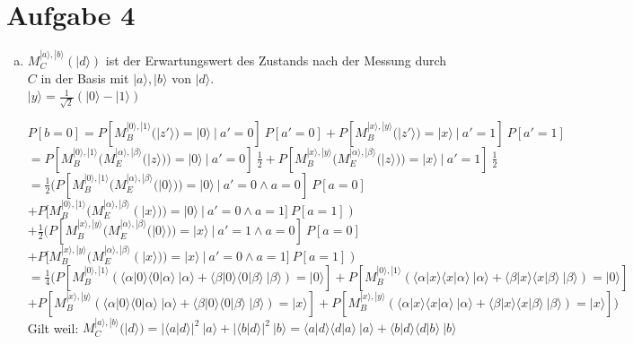 \documentclass[a4paper]{scrartcl}
\begin{document}
\newpage
\section*{Aufgabe 4}
\begin{enumerate}[a)]

\item $M_C^{|a\rangle,|b\rangle}(|d\rangle)$ ist der Erwartungswert des Zustands nach der Messung durch $C$ in der Basis mit $|a\rangle,|b\rangle$ von $|d\rangle$.\\
$|y\rangle = \frac{1}{\sqrt{2}} (|0\rangle -|1\rangle)$

$P[b=0] = P[M_B^{|0\rangle,|1\rangle}(|z'\rangle)=|0\rangle~|~a'=0]~P[a'=0] + P[M_B^{|x\rangle,|y\rangle}(|z'\rangle)=|x\rangle~|~a'=1]~P[a'=1]$\\
$=P[M_B^{|0\rangle,|1\rangle}(M_E^{|\alpha\rangle,|\beta\rangle}(|z\rangle))=|0\rangle~|~a'=0]~\frac{1}{2} + P[M_B^{|x\rangle,|y\rangle}(M_E^{|\alpha\rangle,|\beta\rangle}(|z\rangle))=|x\rangle~|~a'=1]~\frac{1}{2}$\\
$=\frac{1}{2} (P[M_B^{|0\rangle,|1\rangle}(M_E^{|\alpha\rangle,|\beta\rangle}(|0\rangle))=|0\rangle~|~a'=0 \wedge a=0]~P[a=0]$\\
$+ P[M_B^{|0\rangle,|1\rangle}(M_E^{|\alpha\rangle,|\beta\rangle}(|x\rangle))=|0\rangle~|~a'=0 \wedge a=1]~P[a=1])$\\
$+\frac{1}{2} (P[M_B^{|x\rangle,|y\rangle}(M_E^{|\alpha\rangle,|\beta\rangle}(|0\rangle))=|x\rangle~|~a'=1 \wedge a=0]~P[a=0]$\\
$+ P[M_B^{|x\rangle,|y\rangle}(M_E^{|\alpha\rangle,|\beta\rangle}(|x\rangle))=|x\rangle~|~a'=0 \wedge a=1]~P[a=1])$\\
$=\frac{1}{4} (P[M_B^{|0\rangle,|1\rangle}(\langle \alpha|0\rangle \langle 0|\alpha\rangle~|\alpha\rangle + \langle \beta|0\rangle \langle 0|\beta\rangle~|\beta\rangle)=|0\rangle] + P[M_B^{|0\rangle,|1\rangle}(\langle \alpha|x\rangle \langle x|\alpha\rangle~|\alpha\rangle + \langle \beta|x\rangle \langle x|\beta\rangle~|\beta\rangle)=|0\rangle]$\\
$+ P[M_B^{|x\rangle,|y\rangle}(\langle \alpha|0\rangle \langle 0|\alpha\rangle~|\alpha\rangle + \langle \beta|0\rangle \langle 0|\beta\rangle~|\beta\rangle)=|x\rangle] + P[M_B^{|x\rangle,|y\rangle}(\langle \alpha|x\rangle \langle x|\alpha\rangle~|\alpha\rangle + \langle \beta|x\rangle \langle x|\beta\rangle~|\beta\rangle)=|x\rangle])$\\
Gilt weil: $M_C^{|a\rangle,|b\rangle}(|d\rangle) = |\langle a|d\rangle|^2~|a\rangle + |\langle b|d\rangle|^2~|b\rangle =\langle a|d\rangle \langle d|a\rangle~|a\rangle + \langle b|d\rangle \langle d|b\rangle~|b\rangle$\\\\


\end{enumerate}
\end{document}
